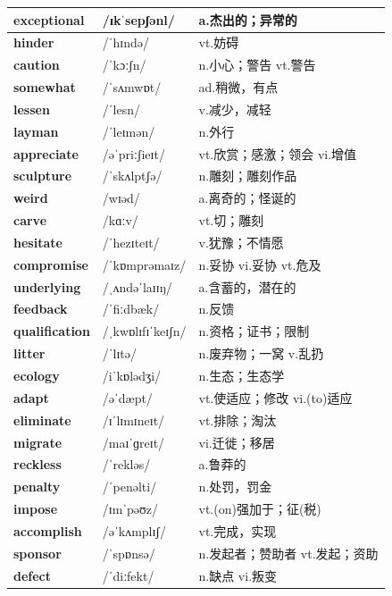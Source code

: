 \documentclass[14pt,a4paper]{extarticle}
\begin{document}
\begin{longtable}{ p{} p{} p{} }
\textbf{exceptional} & /ɪkˈsepʃənl/ & a.杰出的；异常的 \\ \hline
\textbf{hinder} & /ˈhɪndə/ & vt.妨碍 \\ \hline
\textbf{caution} & /ˈkɔːʃn/ & n.小心；警告 \quad vt.警告 \\ \hline
\textbf{somewhat} & /ˈsʌmwɒt/ & ad.稍微，有点 \\ \hline
\textbf{lessen} & /ˈlesn/ & v.减少，减轻 \\ \hline
\textbf{layman} & /ˈleɪmən/ & n.外行 \\ \hline
\textbf{appreciate} & /əˈpriːʃieɪt/ & vt.欣赏；感激；领会 \quad vi.增值 \\ \hline
\textbf{sculpture} & /ˈskʌlptʃə/ & n.雕刻；雕刻作品 \\ \hline
\textbf{weird} & /wɪəd/ & a.离奇的；怪诞的 \\ \hline
\textbf{carve} & /kɑːv/ & vt.切；雕刻 \\ \hline
\textbf{hesitate} & /ˈhezɪteɪt/ & v.犹豫；不情愿 \\ \hline
\textbf{compromise} & /ˈkɒmprəmaɪz/ & n.妥协 \quad vi.妥协 \quad vt.危及 \\ \hline
\textbf{underlying} & /ˌʌndəˈlaɪɪŋ/ & a.含蓄的，潜在的 \\ \hline
\textbf{feedback} & /ˈfiːdbæk/ & n.反馈 \\ \hline
\textbf{qualification} & /ˌkwɒlɪfɪˈkeɪʃn/ & n.资格；证书；限制 \\ \hline
\textbf{litter} & /ˈlɪtə/ & n.废弃物；一窝 \quad v.乱扔 \\ \hline
\textbf{ecology} & /iˈkɒlədʒi/ & n.生态；生态学 \\ \hline
\textbf{adapt} & /əˈdæpt/ & vt.使适应；修改 \quad vi.(to)适应 \\ \hline
\textbf{eliminate} & /ɪˈlɪmɪneɪt/ & vt.排除；淘汰 \\ \hline
\textbf{migrate} & /maɪˈɡreɪt/ & vi.迁徙；移居 \\ \hline
\textbf{reckless} & /ˈrekləs/ & a.鲁莽的 \\ \hline
\textbf{penalty} & /ˈpenəlti/ & n.处罚，罚金 \\ \hline
\textbf{impose} & /ɪmˈpəʊz/ & vt.(on)强加于；征(税) \\ \hline
\textbf{accomplish} & /əˈkʌmplɪʃ/ & vt.完成，实现 \\ \hline
\textbf{sponsor} & /ˈspɒnsə/ & n.发起者；赞助者 \quad vt.发起；资助 \\ \hline
\textbf{defect} & /ˈdiːfekt/ & n.缺点 \quad vi.叛变 \\ \hline

\end{longtable}
\end{document}
